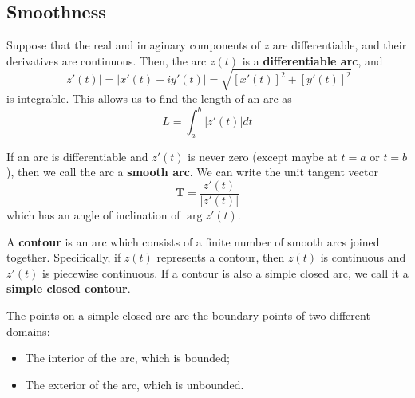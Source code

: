 \documentclass{article}
\renewcommand{\emph}{\textbf}
\begin{document}
\subsection{Smoothness}
Suppose that the real and imaginary components of $z$ are differentiable, and their derivatives are continuous. Then, the arc $z(t)$ is a \emph{differentiable arc}, and
\[
	|z'(t)| = |x'(t) + iy'(t)| = \sqrt{[x'(t)]^2 + [y'(t)]^2}
\]
is integrable. This allows us to find the length of an arc as
\[
	L = \int_a^b |z'(t)| dt
\]

If an arc is differentiable and $z'(t)$ is never zero (except maybe at $t = a$ or $t = b$), then we call the arc a \emph{smooth arc}. We can write the unit tangent vector
\[
	\mathbf{T} = \frac{z'(t)}{|z'(t)|}
\]
which has an angle of inclination of $\arg z'(t)$. 

A \emph{contour} is an arc which consists of a finite number of smooth arcs joined together. Specifically, if $z(t)$ represents a contour, then $z(t)$ is continuous and $z'(t)$ is piecewise continuous. If a contour is also a simple closed arc, we call it a \emph{simple closed contour}. 

The points on a simple closed arc are the boundary points of two different domains:
\begin{itemize}
	\item The interior of the arc, which is bounded;
	\item The exterior of the arc, which is unbounded.
\end{itemize}
\end{document}
